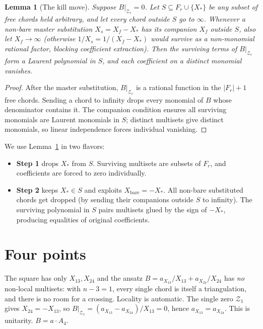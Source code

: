 \documentclass[11pt]{article}
\newtheorem{lemma}{Lemma}
\newcommand{\Zr}{\mathcal{Z}}
\newcommand{\Fr}{F}
\begin{document}
\begin{lemma}[The kill move]\label{lem:move}
Suppose $B|_{\Zr_r}=0$.  Let $S\subseteq \Fr_r\cup\{X_*\}$ be any
subset of free chords held arbitrary, and let every chord outside
$S$ go to $\infty$.  Whenever a non-bare master substitution
$X_s = X_f - X_*$ has its companion $X_f$ outside $S$, also let
$X_f \to \infty$ (otherwise $1/X_s = 1/(X_f-X_*)$ would survive as
a non-monomial rational factor, blocking coefficient extraction).
Then the surviving terms of $B|_{\Zr_r}$ form a Laurent polynomial
in $S$, and each coefficient on a distinct monomial vanishes.
\end{lemma}
\begin{proof}
After the master substitution, $B|_{\Zr_r}$ is a rational function
in the $|\Fr_r|+1$ free chords.  Sending a chord to infinity drops
every monomial of $B$ whose denominator contains it.  The
companion condition ensures all surviving monomials are Laurent
monomials in $S$; distinct multisets give distinct monomials, so
linear independence forces individual vanishing.
\end{proof}

\noindent We use Lemma~\ref{lem:move} in two flavors:
\begin{itemize}\setlength\itemsep{0pt}
  \item \textbf{Step 1} drops $X_*$ from $S$.  Surviving multisets
  are subsets of $\Fr_r$, and coefficients are forced to zero
  individually.
  \item \textbf{Step 2} keeps $X_*\in S$ and exploits
  $X_{\text{bare}}=-X_*$.  All non-bare substituted chords get
  dropped (by sending their companions outside $S$ to infinity).
  The surviving polynomial in $S$ pairs multisets glued by the
  sign of $-X_*$, producing equalities of original coefficients.
\end{itemize}

\section{Four points}

The square has only $X_{13}, X_{24}$ and the ansatz
$B = a_{X_{13}}/X_{13}+a_{X_{24}}/X_{24}$ has \emph{no} non-local
multisets: with $n-3=1$, every single chord is itself a
triangulation, and there is no room for a crossing.  Locality is
automatic.  The single zero $\Zr_1$ gives $X_{24}=-X_{13}$, so
$B|_{\Zr_1}=(a_{X_{13}}-a_{X_{24}})/X_{13}=0$, hence
$a_{X_{13}}=a_{X_{24}}$.  This is unitarity.  $B = a\cdot A_4$.
\end{document}
